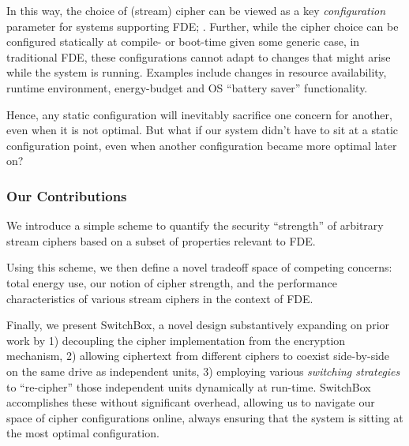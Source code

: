 In this way, the choice of (stream) cipher can be viewed as a key
\emph{configuration} parameter for systems supporting FDE; . Further, while the
cipher choice can be configured statically at compile- or boot-time given some
generic case, in traditional FDE, these configurations cannot adapt to changes
that might arise while the system is running. Examples include changes in
resource availability, runtime environment, energy-budget and OS ``battery
saver'' functionality.

Hence, any static configuration will inevitably sacrifice one concern for
another, even when it is not optimal. But what if our system didn't have to sit
at a static configuration point, even when another configuration became more
optimal later on?

\subsubsection{Our Contributions}

We introduce a simple scheme to quantify the security ``strength'' of
arbitrary stream ciphers based on a subset of properties relevant to
FDE.

Using this scheme, we then define a novel tradeoff space of competing concerns:
total energy use, our notion of cipher strength, and the performance
characteristics of various stream ciphers in the context of FDE.

Finally, we present SwitchBox, a novel design substantively expanding on prior
work by 1) decoupling the cipher implementation from the encryption mechanism,
2) allowing ciphertext from different ciphers to coexist side-by-side on the
same drive as independent units, 3) employing various \emph{switching
strategies} to ``re-cipher'' those independent units dynamically at run-time.
SwitchBox accomplishes these without significant overhead, allowing us to
navigate our space of cipher configurations online, always ensuring that the
system is sitting at the most optimal configuration.


